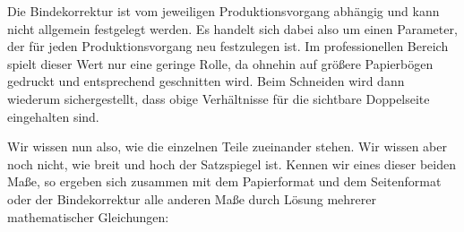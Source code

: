 \begin{Explain}
  Die Bindekorrektur ist vom jeweiligen Produktionsvorgang abhängig und kann
  nicht allgemein festgelegt werden. Es handelt sich dabei also um einen
  Parameter, der für jeden Produktionsvorgang neu festzulegen ist. Im
  professionellen Bereich spielt dieser Wert nur eine geringe Rolle, da
  ohnehin auf größere Papierbögen gedruckt und entsprechend geschnitten
  wird. Beim Schneiden wird dann wiederum sichergestellt, dass obige
  Verhältnisse für die sichtbare Doppelseite eingehalten sind.

  Wir wissen nun also, wie die einzelnen Teile zueinander stehen.  Wir wissen
  aber noch nicht, wie breit und hoch der Satzspiegel ist.  Kennen wir eines
  dieser beiden Maße, so ergeben sich zusammen mit dem Papierformat und dem
  Seitenformat oder der Bindekorrektur alle anderen Maße durch Lösung mehrerer
  mathematischer Gleichungen:
\end{Explain}
